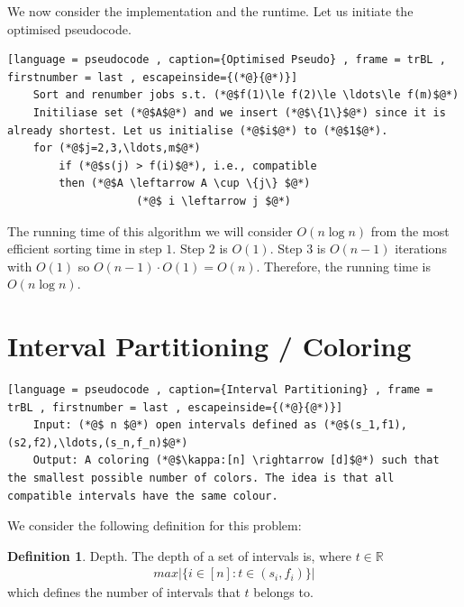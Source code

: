 \documentclass[a4paper]{article}
\theoremstyle{plain}
\theoremstyle{definition}
\newtheorem{defn}{Definition}[section]
\theoremstyle{remark}
\begin{document}
	We now consider the implementation and the runtime. Let us initiate the optimised pseudocode.
	\begin{lstlisting}[language = pseudocode , caption={Optimised Pseudo} , frame = trBL , firstnumber = last , escapeinside={(*@}{@*)}]
	Sort and renumber jobs s.t. (*@$f(1)\le f(2)\le \ldots\le f(m)$@*)
	Initiliase set (*@$A$@*) and we insert (*@$\{1\}$@*) since it is already shortest. Let us initialise (*@$i$@*) to (*@$1$@*).
	for (*@$j=2,3,\ldots,m$@*)
		if (*@$s(j) > f(i)$@*), i.e., compatible
		then (*@$A \leftarrow A \cup \{j\} $@*)
					(*@$ i \leftarrow j $@*)
	\end{lstlisting}	
	The running time of this algorithm we will consider $O(n \log n)$ from the most efficient sorting time in step $1$. Step $2$ is $O(1)$. Step 3 is $O(n-1)$ iterations with $O(1)$ so $O(n-1) \cdot O(1) = O(n)$. Therefore, the running time is $O(n \log n)$.
	\section{Interval Partitioning / Coloring}
	\begin{lstlisting}[language = pseudocode , caption={Interval Partitioning} , frame = trBL , firstnumber = last , escapeinside={(*@}{@*)}]
	Input: (*@$ n $@*) open intervals defined as (*@$(s_1,f1),(s2,f2),\ldots,(s_n,f_n)$@*)
	Output: A coloring (*@$\kappa:[n] \rightarrow [d]$@*) such that the smallest possible number of colors. The idea is that all compatible intervals have the same colour.
	\end{lstlisting}
	We consider the following definition for this problem:
	\begin{defn}
		Depth. The depth of a set of intervals is, where $t \in \mathbb{R}$
		\begin{align*}
			max|\{ i \in [n] : t \in (s_i,f_i)\}|
		\end{align*}
		which defines the number of intervals that $t$ belongs to.
	\end{defn}
\end{document}

